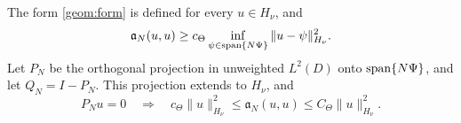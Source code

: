 \begin{proposition}\label{geom:coercivity}
The form \eqref{geom:form} is defined for every $u\in H_\nu$, and
\begin{equation}\label{geom:weightedcoercivity}
 \mathfrak a_N(u,u)\ge c_\Theta
       \inf_{\psi\in\operatorname{span}\{N\Psi\}}\|u-\psi\|_{H_\nu}^2.
\end{equation}
Let $P_N$ be the orthogonal projection in unweighted $L^2(D)$ onto
$\operatorname{span}\{N\Psi\}$, and let $Q_N=I-P_N$. This projection extends to $H_\nu$, and
\begin{equation}\label{geom:microcoercivity}
 P_Nu=0\quad\Longrightarrow\quad
 c_\Theta\|u\|_{H_\nu}^2\le\mathfrak a_N(u,u)
                       \le C_\Theta\|u\|_{H_\nu}^2.
\end{equation}
\end{proposition}
